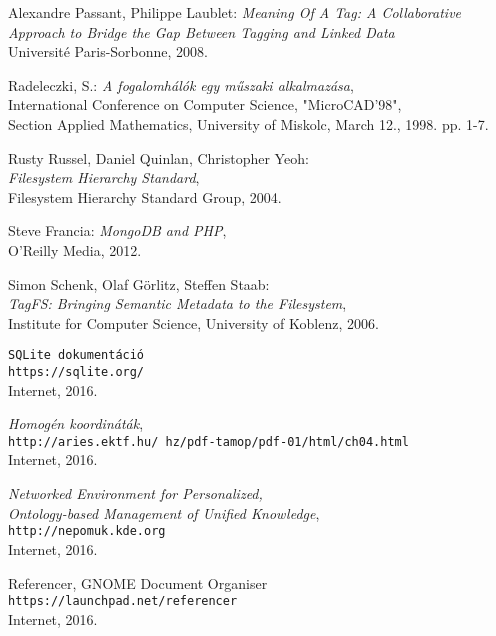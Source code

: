\begin{thebibliography}{9}
Alexandre Passant, Philippe Laublet: \emph{Meaning Of A Tag: A Collaborative Approach to Bridge the Gap Between Tagging and Linked Data} \\
Université Paris-Sorbonne, 2008.

Radeleczki, S.: \emph{A fogalomhálók egy műszaki alkalmazása}, \\
International Conference on Computer Science, "MicroCAD'98", \\
Section Applied Mathematics, University of Miskolc, March 12., 1998. pp. 1-7.

Rusty Russel, Daniel Quinlan, Christopher Yeoh: \\
\emph{Filesystem Hierarchy Standard}, \\
Filesystem Hierarchy Standard Group, 2004.

Steve Francia: \emph{MongoDB and PHP}, \\
O'Reilly Media, 2012.

Simon Schenk, Olaf Görlitz, Steffen Staab: \\
\emph{TagFS: Bringing Semantic Metadata to the Filesystem}, \\
Institute for Computer Science, University of Koblenz, 2006.

\newpage


\bigskip

\texttt{SQLite dokumentáció} \\
\texttt{https://sqlite.org/} \\
Internet, 2016.

\emph{Homogén koordináták}, \\
\texttt{http://aries.ektf.hu/~hz/pdf-tamop/pdf-01/html/ch04.html} \\
Internet, 2016.

\emph{Networked Environment for Personalized, \\
Ontology-based Management of Unified Knowledge}, \\
\texttt{http://nepomuk.kde.org} \\
Internet, 2016.

Referencer, GNOME Document Organiser \\
\texttt{https://launchpad.net/referencer} \\
Internet, 2016.


\end{thebibliography}
